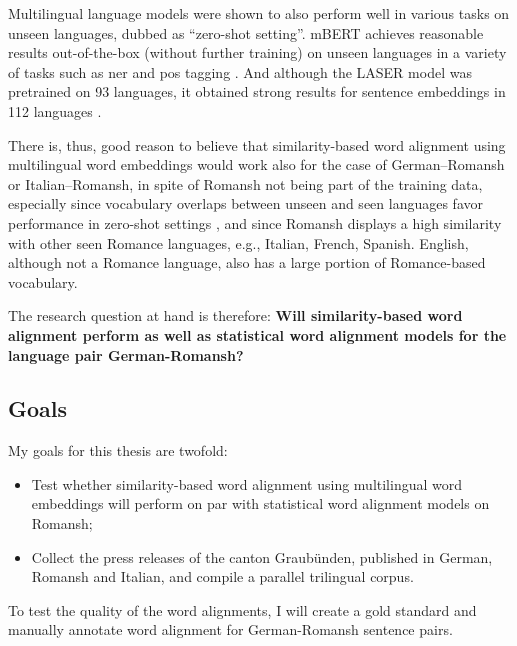 Multilingual language models were shown to also perform  well in various tasks on unseen languages, dubbed as \enquote{zero-shot setting}. 
mBERT achieves reasonable results out-of-the-box (without further training) on unseen languages in a variety of tasks such as \acrfull{ner} and \acrfull{pos} tagging \autocite{pires-etal-2019-multilingual}.
And although the LASER model was pretrained on 93 languages, it obtained strong results for sentence embeddings in 112 languages \autocite{artexte-schwenk-2019-laser}. 

There is, thus, good reason to believe that similarity-based word alignment using multilingual word embeddings would work also for the case of German--Romansh or Italian--Romansh, in spite of Romansh not being part of the training data, especially since vocabulary overlaps between unseen and seen languages favor performance in zero-shot settings \autocite{pires-etal-2019-multilingual}, and since Romansh displays a high similarity with other seen Romance languages, e.g., Italian, French, Spanish. 
English, although not a Romance language, also has a large portion of Romance-based vocabulary.

The research question at hand is therefore: \textbf{Will similarity-based word alignment perform as well as statistical word alignment models for the language pair German-Romansh?}



\subsection{Goals}
My goals for this thesis are twofold:
\begin{itemize}
	\item Test whether similarity-based word alignment using multilingual word embeddings will perform on par with statistical word alignment models on Romansh;

	\item Collect the press releases of the canton Graubünden, published in German, Romansh and Italian, and compile a parallel trilingual corpus. 

\end{itemize}
To test the quality of the word alignments, I will create a gold standard and manually annotate word alignment for German-Romansh sentence pairs.

